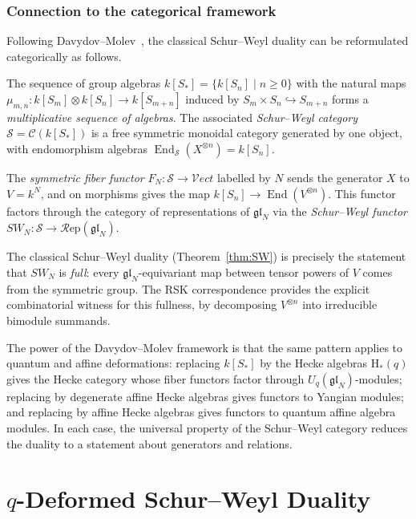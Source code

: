 \documentclass[12pt,a4paper]{article}
\theoremstyle{definition}
\theoremstyle{remark}
\newcommand{\gl}{\mathfrak{gl}}
\newcommand{\End}{\operatorname{End}}
\newcommand{\Rep}{\mathcal{R}\text{ep}}
\begin{document}
\section{Connection to the categorical framework}
\label{sec:categorical}

Following Davydov--Molev~\cite{DM}, the classical Schur--Weyl duality
can be reformulated categorically as follows.

The sequence of group algebras $k[S_*] = \{k[S_n] \mid n \geqslant 0\}$
with the natural maps $\mu_{m,n}: k[S_m] \otimes k[S_n] \to k[S_{m+n}]$
induced by $S_m \times S_n \hookrightarrow S_{m+n}$ forms a
\emph{multiplicative sequence of algebras}. The associated
\emph{Schur--Weyl category} $\mathcal{S} = \mathcal{C}(k[S_*])$ is
a free symmetric monoidal category generated by one object, with
endomorphism algebras $\End_\mathcal{S}(X^{\otimes n}) = k[S_n]$.

The \emph{symmetric fiber functor} $F_N : \mathcal{S} \to
\mathcal{V}\!ect$ labelled by $N$ sends the generator $X$ to $V =
k^N$, and on morphisms gives the map $k[S_n] \to \End(V^{\otimes n})$.
This functor factors through the category of representations of
$\gl_N$ via the \emph{Schur--Weyl functor}
$SW_N : \mathcal{S} \to \Rep(\gl_N)$.

The classical Schur--Weyl duality (Theorem~\ref{thm:SW}) is precisely
the statement that $SW_N$ is \emph{full}: every $\gl_N$-equivariant
map between tensor powers of $V$ comes from the symmetric group.
The RSK correspondence provides the explicit combinatorial witness for
this fullness, by decomposing $V^{\otimes n}$ into irreducible
bimodule summands.

The power of the Davydov--Molev framework is that the same pattern
applies to quantum and affine deformations: replacing $k[S_*]$ by the
Hecke algebras $\mathrm{H}_*(q)$ gives the Hecke category whose fiber
functors factor through $U_q(\gl_N)$-modules; replacing by
degenerate affine Hecke algebras gives functors to Yangian modules;
and replacing by affine Hecke algebras gives functors to quantum
affine algebra modules. In each case, the universal property of the
Schur--Weyl category reduces the duality to a statement about
generators and relations.

\part{$q$-Deformed Schur--Weyl Duality}
\label{part:q}
\end{document}

